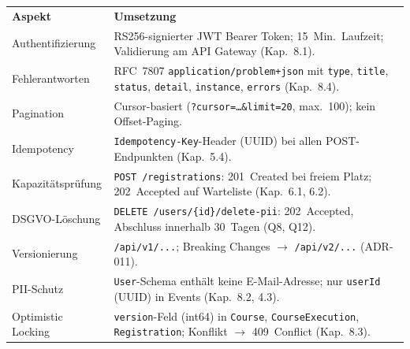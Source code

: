 \begin{tabularx}{\textwidth}{L{3.5cm} X}
  \color{white}\textbf{Aspekt} & \color{white}\textbf{Umsetzung} \\
  Authentifizierung & RS256-signierter JWT Bearer Token; 15~Min.\ Laufzeit;
  Validierung am API Gateway (Kap.~8.1). \\
  Fehlerantworten & RFC~7807 \texttt{application/problem+json} mit
  \texttt{type}, \texttt{title}, \texttt{status}, \texttt{detail},
  \texttt{instance}, \texttt{errors} (Kap.~8.4). \\
  Pagination & Cursor-basiert (\texttt{?cursor=\ldots\&limit=20},
  max.\ 100); kein Offset-Paging. \\
  Idempotency & \texttt{Idempotency-Key}-Header (UUID) bei allen
  POST-Endpunkten (Kap.~5.4). \\
  Kapazitätsprüfung & \texttt{POST /registrations}: 201~Created bei
  freiem Platz; 202~Accepted auf Warteliste (Kap.~6.1, 6.2). \\
  DSGVO-Löschung & \texttt{DELETE /users/\{id\}/delete-pii}: 202~Accepted,
  Abschluss innerhalb 30~Tagen (Q8, Q12). \\
  Versionierung & \texttt{/api/v1/...}; Breaking Changes $\to$
  \texttt{/api/v2/...} (ADR-011). \\
  PII-Schutz & \texttt{User}-Schema enthält keine E-Mail-Adresse;
  nur \texttt{userId} (UUID) in Events (Kap.~8.2, 4.3). \\
  Optimistic Locking & \texttt{version}-Feld (int64) in
  \texttt{Course}, \texttt{CourseExecution}, \texttt{Registration};
  Konflikt $\to$ 409~Conflict (Kap.~8.3). \\
\end{tabularx}
